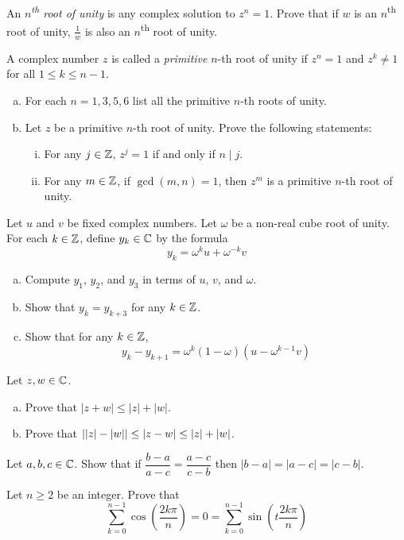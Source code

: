 \question An \emph{$n$\textsuperscript{th} root of unity} is any complex solution to $z^n=1$.
Prove that if $w$ is an $n$\textsuperscript{th} root of unity,
$\frac1w$ is also an $n$\textsuperscript{th} root of unity.

\question A complex number $z$ is called a \emph{primitive} $n$-th root of unity
if $z^n=1$ and $z^k \neq 1$ for all $1 \leq k \leq n-1$.
\begin{enumerate}[(a)]
  \item For each $n=1,3,5,6$ list all the primitive $n$-th roots of unity.
  \item Let $z$ be a primitive $n$-th root of unity. Prove the following statements:
        \begin{enumerate}[i.]
          \item For any $j\in\mathbb{Z}$, $z^j=1$ if and only if $n \mid j$.
          \item For any $m\in\mathbb{Z}$, if $\gcd(m,n)=1$, then $z^m$ is a primitive $n$-th root of unity.
        \end{enumerate}
\end{enumerate}

\question Let $u$ and $v$ be fixed complex numbers.
Let $\omega$ be a non-real cube root of unity.
For each $k\in\mathbb{Z}$, define $y_k\in\mathbb{C}$ by the formula \[ y_k = \omega^k u + \omega^{-k}v \]
\begin{enumerate}[(a)]
  \item Compute $y_1$, $y_2$, and $y_3$ in terms of $u$, $v$, and $\omega$.
  \item Show that $y_k = y_{k+3}$ for any $k\in\mathbb{Z}$.
  \item Show that for any $k\in\mathbb{Z}$, \[ y_k-y_{k+1} = \omega^k(1-\omega)(u-\omega^{k-1}v) \]
\end{enumerate}



\question Let $z,w\in\mathbb{C}$.
\begin{enumerate}[(a)]
  \item Prove that $|z+w| \leq |z| + |w|$.
  \item Prove that $\abs{|z| - |w|} \leq |z-w| \leq |z|+|w|$.
\end{enumerate}

\question Let $a,b,c\in\mathbb{C}$.
Show that if $\dfrac{b-a}{a-c} = \dfrac{a-c}{c-b}$ then $|b-a| = |a-c| = |c-b|$.

\question Let $n \geq 2$ be an integer. Prove that
\[ \sum_{k=0}^{n-1}\cos\left(\frac{2k\pi}{n}\right)=0=\sum_{k=0}^{n-1}\sin\left(t\frac{2k\pi}{n}\right) \]

